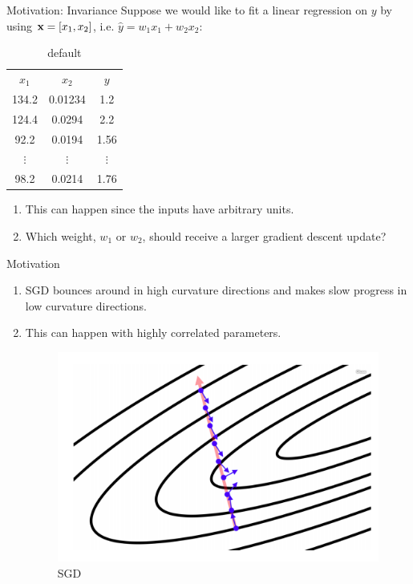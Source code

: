 \documentclass[xcolor=pdftex,dvipsnames,table,mathserif]{beamer}
\begin{document}
\begin{frame}{Motivation: Invariance}
Suppose we would like to fit a linear regression on $y$ by using $\mathbf{x}=[x_1,x_2]$, i.e. $\hat{y}=w_1x_1+w_2x_2$:
\begin{table}[htdp]
\caption{default}
\begin{center}
\begin{tabular}{|c|c|c|}
$x_1$ & $x_2$ & $y$ \\
134.2 & 0.01234 & 1.2 \\
124.4 & 0.0294 & 2.2 \\
92.2& 0.0194 & 1.56 \\
$\vdots$ & $\vdots$ &$\vdots$ \\
98.2& 0.0214 & 1.76 \\
\end{tabular}
\end{center}
\label{default}
\end{table}%
\begin{enumerate}
\item This can happen since the inputs have arbitrary units.
\item Which weight, $w_1$ or $w_2$, should receive a larger gradient descent update?
\end{enumerate}
\end{frame}



\begin{frame}{Motivation}
\begin{enumerate}
\item SGD bounces around in high curvature directions and makes slow progress in low curvature directions. 
\item This can happen with highly correlated parameters.
\begin{figure}
\includegraphics[width=.45\columnwidth]{../graphics/EllipseSGD}
\caption{SGD}%
\end{figure}
\end{enumerate}
\end{frame}
\end{document}
